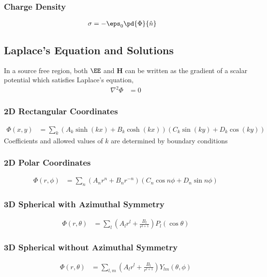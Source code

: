 \documentclass[11pt]{article}
\renewcommand{\HH}{\mathbf{H}}
\begin{document}
\subsubsection{Charge Density}
\label{sec:org896c91f}
\begin{align*}
\sigma & = -\eps_0 \pd{\Phi}{\hat{n}}
\end{align*}

\subsection{Laplace's Equation and Solutions}
\label{sec:org004aba9}
In a source free region, both \(\EE\) and \(\HH\) can be written as the gradient of a scalar potential which satisfies Laplace's equation,
\begin{align*}
\nabla^2 \Phi & = 0
\end{align*}
\subsubsection{2D Rectangular Coordinates}
\label{sec:org94f86d9}
\begin{align*}
\Phi(x,y) & = \sum_k (A_k \sinh(kx) + B_k \cosh(kx)) (C_k \sin(ky) + D_k \cos(ky))
\end{align*}
Coefficients and allowed values of \(k\) are determined by boundary conditions
\subsubsection{2D Polar Coordinates}
\label{sec:orge995bb7}
\begin{align*}
\Phi(r, \phi) & = \sum_n (A_n r^n + B_n r^{-n}) (C_n \cos n\phi + D_n \sin n\phi)
\end{align*}
\subsubsection{3D Spherical with Azimuthal Symmetry}
\label{sec:org579d679}
\begin{align*}
\Phi(r, \theta) & = \sum_l \left( A_l r^l + \frac{B_l}{r^{l+1}} \right) P_l(\cos \theta)
\end{align*}
\subsubsection{3D Spherical without Azimuthal Symmetry}
\label{sec:orgd15ffdb}
\begin{align*}
\Phi(r, \theta) & = \sum_{l,m} \left( A_l r^l + \frac{B_l}{r^{l+1}} \right) Y_{lm}(\theta, \phi)
\end{align*}
\end{document}
